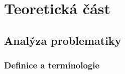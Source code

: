 \documentclass[twoside]{ctuthesis}
\begin{document}
%
%
%
%
%
%


\part{Teoretická část}
\chapter{Analýza problematiky}

\section{Definice a terminologie}
\end{document}
